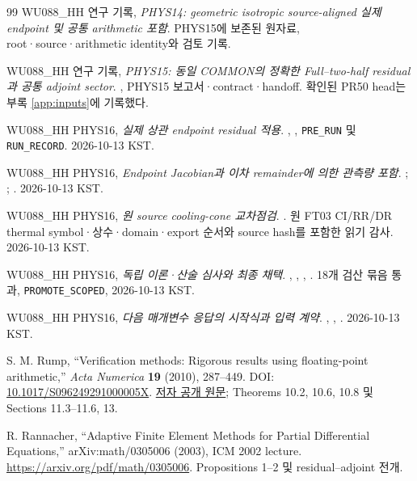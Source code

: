 \begin{thebibliography}{99}\small
{} WU088\_HH 연구 기록, \emph{PHYS14: geometric isotropic source-aligned 실제 endpoint 및 공통 arithmetic 포함}. PHYS15에 보존된  원자료, root·source·arithmetic identity와 검토 기록.

 WU088\_HH 연구 기록, \emph{PHYS15: 동일 COMMON의 정확한 Full--two-half residual과 공통 adjoint sector}. , PHYS15 보고서·contract·handoff. 확인된 PR50 head는 부록 \ref{app:inputs}에 기록했다.

 WU088\_HH PHYS16, \emph{실제 상관 endpoint residual 적용}. , , \texttt{PRE\_RUN} 및 \texttt{RUN\_RECORD}. 2026-10-13 KST.

 WU088\_HH PHYS16, \emph{Endpoint Jacobian과 이차 remainder에 의한 관측량 포함}. ; ; . 2026-10-13 KST.

 WU088\_HH PHYS16, \emph{원 source cooling-cone 교차점검}. . 원 FT03 CI/RR/DR thermal symbol·상수·domain·export 순서와 source hash를 포함한 읽기 감사. 2026-10-13 KST.

 WU088\_HH PHYS16, \emph{독립 이론·산술 심사와 최종 채택}. , , , . 18개 검산 묶음 통과, \texttt{PROMOTE\_SCOPED}, 2026-10-13 KST.

 WU088\_HH PHYS16, \emph{다음 매개변수 응답의 시작식과 입력 계약}. , , . 2026-10-13 KST.

 S. M. Rump, ``Verification methods: Rigorous results using floating-point arithmetic,'' \emph{Acta Numerica} \textbf{19} (2010), 287--449. DOI: \href{https://doi.org/10.1017/S096249291000005X}{10.1017/S096249291000005X}. \href{https://www.tuhh.de/ti3/paper/rump/Ru10.pdf}{저자 공개 원문}; Theorems 10.2, 10.6, 10.8 및 Sections 11.3--11.6, 13.

 R. Rannacher, ``Adaptive Finite Element Methods for Partial Differential Equations,'' arXiv:math/0305006 (2003), ICM 2002 lecture. \url{https://arxiv.org/pdf/math/0305006}. Propositions 1--2 및 residual--adjoint 전개.


\end{thebibliography}
